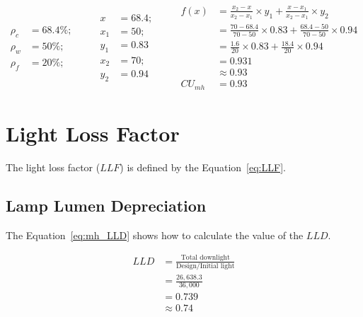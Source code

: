\begin{equation}
\begin{split}
\rho_c &= 68.4\%; \\
\rho_w &= 50\%; \\
\rho_f &= 20\%;
\end{split}
\qquad
\begin{split}
x &= 68.4; \\
x_1 &= 50; \\ y_1 &= 0.83 \\
x_2 &= 70; \\ y_2 &= 0.94
\end{split}
\qquad
\begin{split}
f(x) &= \frac{x_2 - x}{x_2 - x_1} \times y_1 +
       \frac{x - x_1}{x_2 - x_1} \times y_2 \\
 &= \frac{70 - 68.4}{70 - 50} \times 0.83 +
    \frac{68.4 - 50}{70 - 50} \times 0.94 \\
 &= \frac{1.6}{20} \times 0.83 +
    \frac{18.4}{20} \times 0.94 \\
 & = 0.931 \\
 & \approx 0.93 \\
CU_{mh} & = 0.93
\end{split}
\label{eq:mh_cu}
\end{equation}

\section{Light Loss Factor}
The light loss factor ($LLF$) is defined by the Equation~\ref{eq:LLF}.

\subsection{Lamp Lumen Depreciation}
The Equation~\ref{eq:mh_LLD} shows how to calculate the value of the $LLD$.

\begin{equation}
\begin{split}
LLD & = \frac{\text{Total downlight}}{\text{Design/Initial light}} \\
 & = \frac{26,638.3}{36,000} \\
 & =  0.739 \\
 & \approx 0.74
\end{split}
\label{eq:mh_LLD}
\end{equation}

